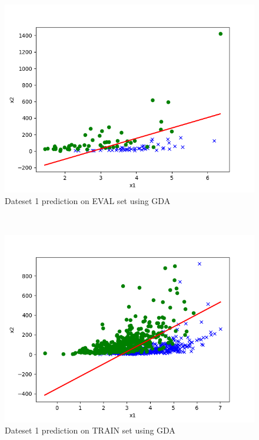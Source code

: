 \begin{answer}
\begin{figure}
  \includegraphics[width=\linewidth]{p01e_pred_1_eval.png}
  \caption{Dateset 1 prediction on EVAL set using GDA}
  \label{fig:Dateset 1 prediction on EVAL set using GDA}
\end{figure}\\
\begin{figure}
  \includegraphics[width=\linewidth]{p01e_pred_1_train.png}
  \caption{Dateset 1 prediction on TRAIN set using GDA}
  \label{fig:Dateset 1 prediction on TRAIN set using GDA}
\end{figure}\\
\end{answer}

